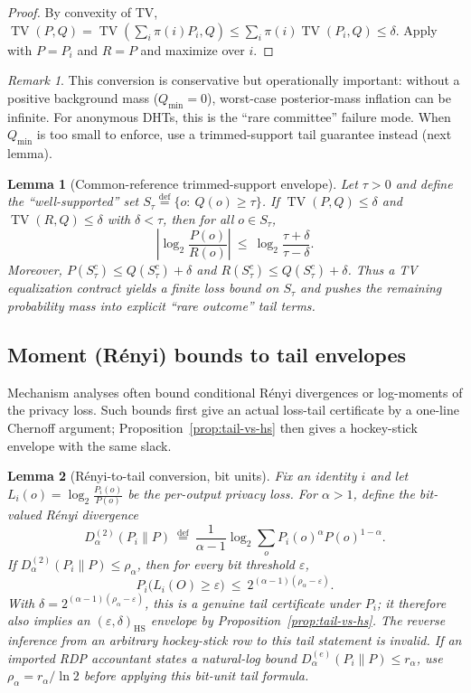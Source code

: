 \documentclass[11pt]{article}
\DeclareMathOperator{\TV}{TV}
\newcommand{\defeq}{\stackrel{\mathrm{def}}{=}}
\newtheorem{lemma}{Lemma}
\theoremstyle{definition}
\theoremstyle{remark}
\newtheorem{remark}{Remark}
\begin{document}
\begin{proof}
By convexity of TV, $\TV(P,Q)=\TV(\sum_i\pi(i)P_i,Q)\le \sum_i \pi(i)\TV(P_i,Q)\le \delta$.
Apply  with $P=P_i$ and $R=P$ and maximize over $i$.
\end{proof}

\begin{remark}
This conversion is conservative but operationally important: without a positive background mass ($Q_{\min}=0$), worst-case posterior-mass inflation can be infinite.
For anonymous DHTs, this is the ``rare committee'' failure mode.
When $Q_{\min}$ is too small to enforce, use a trimmed-support tail guarantee instead (next lemma).
\end{remark}

\begin{lemma}[Common-reference trimmed-support envelope]\label{lem:tv_trimmed}
Let $\tau>0$ and define the ``well-supported'' set $S_\tau\defeq\{o:\ Q(o)\ge \tau\}$.
If $\TV(P,Q)\le \delta$ and $\TV(R,Q)\le \delta$ with $\delta<\tau$, then for all $o\in S_\tau$,
\[
\left|\log_2\frac{P(o)}{R(o)}\right|\ \le\ \log_2\frac{\tau+\delta}{\tau-\delta}.
\]
Moreover, $P(S_\tau^c)\le Q(S_\tau^c)+\delta$ and $R(S_\tau^c)\le Q(S_\tau^c)+\delta$.
Thus a TV equalization contract yields a finite loss bound on $S_\tau$ and pushes the remaining probability mass into explicit ``rare outcome'' tail terms.
\end{lemma}

\subsection{Moment (R\'enyi) bounds to tail envelopes}
Mechanism analyses often bound conditional R\'enyi divergences or log-moments of the privacy loss.
Such bounds first give an actual loss-tail certificate by a one-line Chernoff argument; Proposition~\ref{prop:tail-vs-hs} then gives a hockey-stick envelope with the same slack.

\begin{lemma}[R\'enyi-to-tail conversion, bit units]\label{lem:renyi_tail}
Fix an identity $i$ and let $L_i(o)=\log_2\frac{P_i(o)}{P(o)}$ be the per-output privacy loss.
For $\alpha>1$, define the bit-valued R\'enyi divergence
\[
D_\alpha^{(2)}(P_i\|P)\ \defeq\ \frac{1}{\alpha-1}\log_2\sum_o P_i(o)^\alpha P(o)^{1-\alpha}.
\]
If $D_\alpha^{(2)}(P_i\|P)\le \rho_\alpha$, then for every bit threshold $\varepsilon$,
\[
P_i\!\bigl(L_i(O)\ge \varepsilon\bigr)\ \le\ 2^{(\alpha-1)(\rho_\alpha-\varepsilon)}.
\]
With $\delta=2^{(\alpha-1)(\rho_\alpha-\varepsilon)}$, this is a genuine tail certificate under $P_i$; it therefore also implies an $(\varepsilon,\delta)_{\mathrm{HS}}$ envelope by Proposition~\ref{prop:tail-vs-hs}. The reverse inference from an arbitrary hockey-stick row to this tail statement is invalid.
If an imported RDP accountant states a natural-log bound $D_\alpha^{(e)}(P_i\|P)\le r_\alpha$, use $\rho_\alpha=r_\alpha/\ln 2$ before applying this bit-unit tail formula.
\end{lemma}
\end{document}
